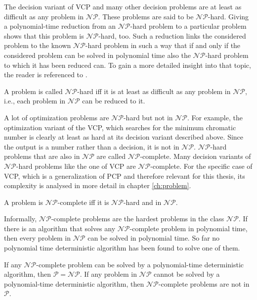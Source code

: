 The decision variant of VCP and many other decision problems are at least as difficult as any problem in $\mathcal{NP}$. These problems are said to be $\mathcal{NP}$-hard. Giving a polynomial-time reduction from an $\mathcal{NP}$-hard problem to a particular problem shows that this problem is $\mathcal{NP}$-hard, too. Such a reduction links the considered problem to the known $\mathcal{NP}$-hard problem in such a way that if and only if the considered problem can be solved in polynomial time also the $\mathcal{NP}$-hard problem to which it has been reduced can.\cite{neumann-10} To gain a more detailed insight into that topic, the reader is referenced to \cite{wegener-05}. 

\begin{definition}
A problem is called $\mathcal{NP}$-hard iff it is at least as difficult as any problem in $\mathcal{NP}$, i.e., each problem in $\mathcal{NP}$ can be reduced to it.
\end{definition}

A lot of optimization problems are $\mathcal{NP}$-hard but not in $\mathcal{NP}$. For example, the optimization variant of the VCP, which searches for the minimum chromatic number is clearly at least as hard at its decision variant described above. Since the output is a number rather than a decision, it is not in $\mathcal{NP}$. $\mathcal{NP}$-hard problems that are also in $\mathcal{NP}$ are called $\mathcal{NP}$-complete. Many decision variants of $\mathcal{NP}$-hard problems like the one of VCP are $\mathcal{NP}$-complete. For the specific case of VCP, which is a generalization of PCP and therefore relevant for this thesis, its complexity is analysed in more detail in chapter \ref{ch:problem}.

\begin{definition}
A problem is $\mathcal{NP}$-complete iff it is $\mathcal{NP}$-hard and in $\mathcal{NP}$.
\end{definition}

Informally, $\mathcal{NP}$-complete problems are the hardest problems in the class $\mathcal{NP}$. If there is an algorithm that solves any $\mathcal{NP}$-complete problem in polynomial time, then every problem in $\mathcal{NP}$ can be solved in polynomial time. So far no polynomial time deterministic algorithm has been found to solve one of them. 

\begin{theorem}
If any $\mathcal{NP}$-complete problem can be solved by a polynomial-time deterministic algorithm, then $\mathcal{P} = \mathcal{NP}$. If any problem in $\mathcal{NP}$ cannot be solved by a polynomial-time deterministic algorithm, then $\mathcal{NP}$-complete problems are not in $\mathcal{P}$.
\end{theorem}

